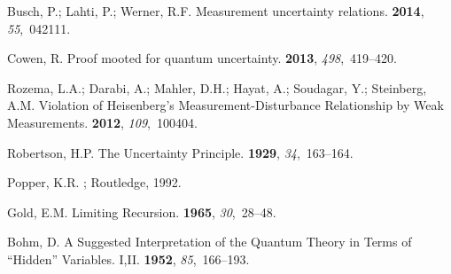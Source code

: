 \documentclass[information,article,submit,moreauthors,pdftex,12pt,a4paper]{mdpi}
\theoremstyle{mdpi}
\newcounter{re}
\theoremstyle{mdpidefinition}
\begin{document}
\begin{thebibliography}{-------}
Busch, P.; Lahti, P.; Werner, R.F.
\newblock Measurement uncertainty relations.
 {\bf 2014}, {\em 55},~042111.

Cowen, R.
\newblock Proof mooted for quantum uncertainty.
 {\bf 2013}, {\em 498},~419--420.

Rozema, L.A.; Darabi, A.; Mahler, D.H.; Hayat, A.; Soudagar, Y.; Steinberg,
  A.M.
\newblock Violation of {H}eisenberg's Measurement-Disturbance Relationship by
  Weak Measurements.
 {\bf 2012}, {\em 109},~100404.

Robertson, H.P.
\newblock The Uncertainty Principle.
 {\bf 1929}, {\em 34},~163--164.

Popper, K.R.
; Routledge,  1992.

Gold, E.M.
\newblock Limiting Recursion.
 {\bf 1965}, {\em 30},~28--48.

Bohm, D.
\newblock A Suggested Interpretation of the Quantum Theory in Terms of
  ``Hidden'' Variables. {I,II}.
 {\bf 1952}, {\em 85},~166--193.

\end{thebibliography}
\end{document}
